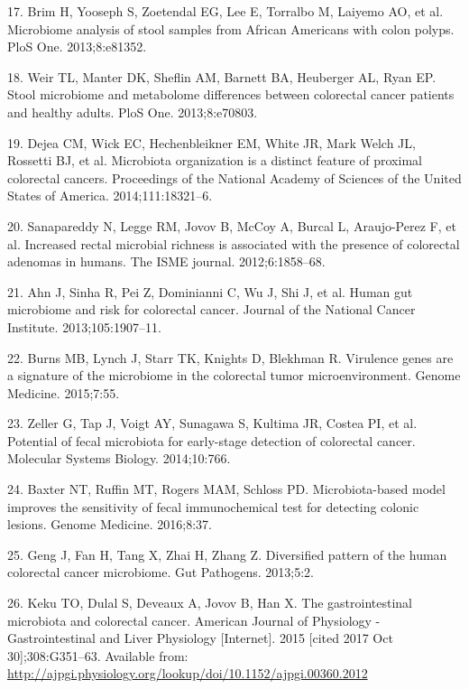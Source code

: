 \documentclass[12pt,]{article}
\begin{document}
\hypertarget{ref-brim_microbiome_2013}{}
17. Brim H, Yooseph S, Zoetendal EG, Lee E, Torralbo M, Laiyemo AO, et
al. Microbiome analysis of stool samples from African Americans with
colon polyps. PloS One. 2013;8:e81352.

\hypertarget{ref-weir_stool_2013}{}
18. Weir TL, Manter DK, Sheflin AM, Barnett BA, Heuberger AL, Ryan EP.
Stool microbiome and metabolome differences between colorectal cancer
patients and healthy adults. PloS One. 2013;8:e70803.

\hypertarget{ref-dejea_microbiota_2014}{}
19. Dejea CM, Wick EC, Hechenbleikner EM, White JR, Mark Welch JL,
Rossetti BJ, et al. Microbiota organization is a distinct feature of
proximal colorectal cancers. Proceedings of the National Academy of
Sciences of the United States of America. 2014;111:18321--6.

\hypertarget{ref-sanapareddy_increased_2012}{}
20. Sanapareddy N, Legge RM, Jovov B, McCoy A, Burcal L, Araujo-Perez F,
et al. Increased rectal microbial richness is associated with the
presence of colorectal adenomas in humans. The ISME journal.
2012;6:1858--68.

\hypertarget{ref-ahn_human_2013}{}
21. Ahn J, Sinha R, Pei Z, Dominianni C, Wu J, Shi J, et al. Human gut
microbiome and risk for colorectal cancer. Journal of the National
Cancer Institute. 2013;105:1907--11.

\hypertarget{ref-burns_virulence_2015}{}
22. Burns MB, Lynch J, Starr TK, Knights D, Blekhman R. Virulence genes
are a signature of the microbiome in the colorectal tumor
microenvironment. Genome Medicine. 2015;7:55.

\hypertarget{ref-zeller_potential_2014}{}
23. Zeller G, Tap J, Voigt AY, Sunagawa S, Kultima JR, Costea PI, et al.
Potential of fecal microbiota for early-stage detection of colorectal
cancer. Molecular Systems Biology. 2014;10:766.

\hypertarget{ref-baxter_microbiota-based_2016}{}
24. Baxter NT, Ruffin MT, Rogers MAM, Schloss PD. Microbiota-based model
improves the sensitivity of fecal immunochemical test for detecting
colonic lesions. Genome Medicine. 2016;8:37.

\hypertarget{ref-geng_diversified_2013}{}
25. Geng J, Fan H, Tang X, Zhai H, Zhang Z. Diversified pattern of the
human colorectal cancer microbiome. Gut Pathogens. 2013;5:2.

\hypertarget{ref-keku_gastrointestinal_2015}{}
26. Keku TO, Dulal S, Deveaux A, Jovov B, Han X. The gastrointestinal
microbiota and colorectal cancer. American Journal of Physiology -
Gastrointestinal and Liver Physiology {[}Internet{]}. 2015 {[}cited 2017
Oct 30{]};308:G351--63. Available from:
\url{http://ajpgi.physiology.org/lookup/doi/10.1152/ajpgi.00360.2012}
\end{document}
